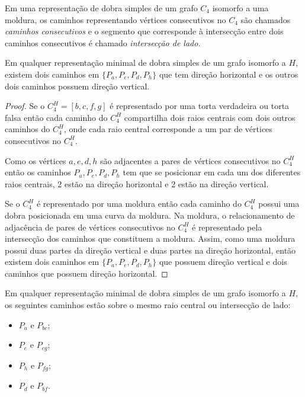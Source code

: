 \begin{definition}
Em uma representação de dobra simples de um grafo  $C_4$ isomorfo a uma moldura, os caminhos representando vértices consecutivos no  $C_4$ são chamados \emph{caminhos consecutivos} e o segmento que corresponde à intersecção entre dois caminhos consecutivos é chamado \emph{intersecção de lado}.  
\end{definition}

\begin{lema}\label{lem:2vertical2horizontal}
Em qualquer representação minimal de dobra simples de um grafo isomorfo a $H$, existem dois caminhos em   $\{P_a, P_e, P_d, P_h \}$ que tem direção horizontal e os outros dois caminhos possuem direção vertical.
\end{lema}

\begin{proof}
Se o $C_4^{H} = [b,c,f,g]$ é representado por uma torta verdadeira ou torta falsa então cada caminho do  $C_4^{H}$ compartilha dois raios centrais com dois outros caminhos do  $C_4^{H}$, onde cada raio central corresponde a um par de vértices consecutivos no $C_4^{H}$.

Como os vértices  $a, e, d, h$ são adjacentes a pares de vértices consecutivos no $C_4^{H}$ então os caminhos $P_a, P_e, P_d, P_h$ tem que se posicionar em cada um dos diferentes raios centrais,  2 estão na direção horizontal e 2 estão na direção vertical.

Se o $C_4^{H}$ é representado por uma moldura então cada caminho do $C_4^{H}$ possui uma dobra posicionada em uma curva da moldura. Na moldura, o relacionamento de adjacência de pares de vértices consecutivos no $C_4^{H}$ é representado pela intersecção dos caminhos que constituem a moldura. Assim, como uma moldura possui duas partes da direção vertical e duas partes na direção horizontal, então existem dois caminhos em $\{P_a, P_e, P_d, P_h\}$ que possuem direção vertical e dois caminhos que possuem direção horizontal.
 \end{proof}

\begin{corollary}
 \label{coro:paresMesmoSegmento}
Em qualquer representação minimal de dobra simples de um grafo isomorfo a $H$, os seguintes caminhos estão sobre o mesmo raio central ou intersecção de lado: %

\begin{itemize}
\item $P_a$ e $P_{bc}$;
\item $P_e$ e $P_{cg}$;
\item $P_h$ e $P_{fg}$;
\item $P_d$ e $P_{bf}$.
\end{itemize}
\end{corollary}


